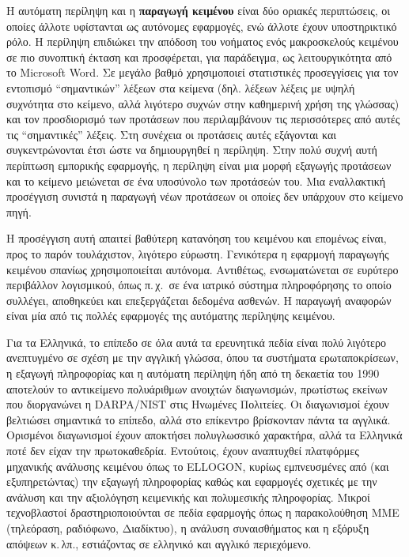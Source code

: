 \begin{multicols}{2}
Η αυτόματη περίληψη και η \textbf{παραγωγή κειμένου} είναι δύο οριακές περιπτώσεις, οι οποίες άλλοτε υφίστανται ως αυτόνομες εφαρμογές, ενώ άλλοτε έχουν υποστηρικτικό ρόλο. Η περίληψη επιδιώκει την απόδοση του νοήματος ενός μακροσκελούς κειμένου σε πιο συνοπτική έκταση και προσφέρεται, για παράδειγμα, ως λειτουργικότητα από το Microsoft Word. Σε μεγάλο βαθμό χρησιμοποιεί στατιστικές προσεγγίσεις για τον εντοπισμό ``σημαντικών'' λέξεων στα κείμενα (δηλ. λέξεων λέξεις με υψηλή συχνότητα στο κείμενο, αλλά λιγότερο συχνών στην καθημερινή χρήση της γλώσσας) και τον προσδιορισμό των προτάσεων που περιλαμβάνουν τις περισσότερες από αυτές τις ``σημαντικές'' λέξεις. Στη συνέχεια οι προτάσεις αυτές εξάγονται και συγκεντρώνονται έτσι ώστε να δημιουργηθεί η περίληψη. Στην πολύ συχνή αυτή περίπτωση εμπορικής εφαρμογής, η περίληψη είναι μια μορφή εξαγωγής προτάσεων και το κείμενο μειώνεται σε ένα υποσύνολο των προτάσεών του. Μια εναλλακτική προσέγγιση συνιστά η παραγωγή νέων προτάσεων οι οποίες δεν υπάρχουν στο κείμενο πηγή.


Η προσέγγιση αυτή απαιτεί βαθύτερη κατανόηση του κειμένου και επομένως είναι, προς το παρόν τουλάχιστον, λιγότερο εύρωστη. Γενικότερα η εφαρμογή παραγωγής κειμένου σπανίως χρησιμοποιείται αυτόνομα. Αντιθέτως, ενσωματώνεται σε ευρύτερο περιβάλλον λογισμικού, όπως π.\,χ.~σε ένα ιατρικό σύστημα πληροφόρησης το οποίο συλλέγει, αποθηκεύει και επεξεργάζεται δεδομένα ασθενών. Η παραγωγή αναφορών είναι μία από τις πολλές εφαρμογές της αυτόματης περίληψης κειμένου. 

Για τα Ελληνικά, το επίπεδο σε όλα αυτά τα ερευνητικά πεδία είναι πολύ λιγότερο ανεπτυγμένο σε σχέση με την αγγλική γλώσσα, όπου τα συστήματα ερωταποκρίσεων, η εξαγωγή πληροφορίας και η αυτόματη περίληψη ήδη από τη δεκαετία του 1990 αποτελούν το αντικείμενο πολυάριθμων ανοιχτών διαγωνισμών, πρωτίστως εκείνων που διοργανώνει η DARPA/NIST στις Ηνωμένες Πολιτείες. Οι διαγωνισμοί έχουν βελτιώσει σημαντικά το επίπεδο, αλλά στο επίκεντρο βρίσκονταν πάντα τα αγγλικά. Ορισμένοι διαγωνισμοί έχουν αποκτήσει πολυγλωσσικό χαρακτήρα, αλλά τα Ελληνικά ποτέ δεν είχαν την πρωτοκαθεδρία. Εντούτοις, έχουν αναπτυχθεί πλατφόρμες μηχανικής ανάλυσης κειμένου όπως το ELLOGON, κυρίως εμπνευσμένες από (και εξυπηρετώντας) την εξαγωγή πληροφορίας καθώς και εφαρμογές σχετικές με την ανάλυση και την  αξιολόγηση κειμενικής και πολυμεσικής πληροφορίας. Μικροί τεχνοβλαστοί δραστηριοποιούνται σε πεδία εφαρμογής όπως η παρακολούθηση ΜΜΕ (τηλεόραση, ραδιόφωνο, Διαδίκτυο), η ανάλυση συναισθήματος και η εξόρυξη απόψεων κ.\,λπ., εστιάζοντας σε ελληνικό και αγγλικό περιεχόμενο. 


\end{multicols}
